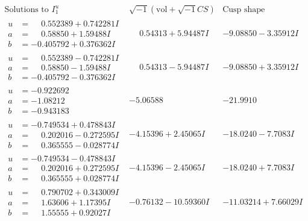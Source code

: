 \documentclass[1p]{elsarticle_modified}
\theoremstyle{definition}
\newcommand{\I}{\sqrt{-1}}
\begin{document}
$$\begin{array}{c|c|c}  
\text{Solutions to }I^u_{1}& \I (\text{vol} + \sqrt{-1}CS) & \text{Cusp shape}\\
 \hline 
\begin{aligned}
u &= \phantom{-}0.552389 + 0.742281 I \\
a &= \phantom{-}0.58850 + 1.59488 I \\
b &= -0.405792 + 0.376362 I\end{aligned}
 & \phantom{-}0.54313 + 5.94487 I & -9.08850 - 3.35912 I \\ \hline\begin{aligned}
u &= \phantom{-}0.552389 - 0.742281 I \\
a &= \phantom{-}0.58850 - 1.59488 I \\
b &= -0.405792 - 0.376362 I\end{aligned}
 & \phantom{-}0.54313 - 5.94487 I & -9.08850 + 3.35912 I \\ \hline\begin{aligned}
u &= -0.922692\phantom{ +0.000000I} \\
a &= -1.08212\phantom{ +0.000000I} \\
b &= -0.943183\phantom{ +0.000000I}\end{aligned}
 & -5.06588\phantom{ +0.000000I} & -21.9910\phantom{ +0.000000I} \\ \hline\begin{aligned}
u &= -0.749534 + 0.478843 I \\
a &= \phantom{-}0.202016 - 0.272595 I \\
b &= \phantom{-}0.365555 - 0.028774 I\end{aligned}
 & -4.15396 + 2.45065 I & -18.0240 - 7.7083 I \\ \hline\begin{aligned}
u &= -0.749534 - 0.478843 I \\
a &= \phantom{-}0.202016 + 0.272595 I \\
b &= \phantom{-}0.365555 + 0.028774 I\end{aligned}
 & -4.15396 - 2.45065 I & -18.0240 + 7.7083 I \\ \hline\begin{aligned}
u &= \phantom{-}0.790702 + 0.343009 I \\
a &= \phantom{-}1.63606 + 1.17395 I \\
b &= \phantom{-}1.55555 + 0.92027 I\end{aligned}
 & -0.76132 - 10.59360 I & -11.03214 + 7.66029 I \\ \hline\begin{aligned}

\end{aligned}
\end{array}$$
\end{document}
